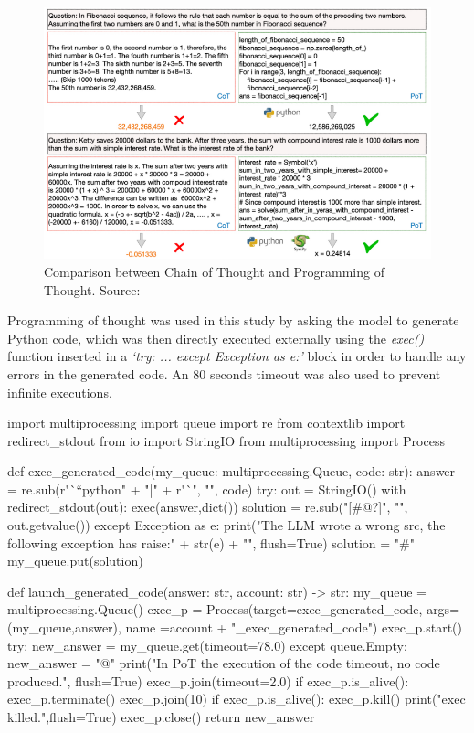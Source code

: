\documentclass[12pt]{article}
\begin{document}
    \begin{figure}[H]
    \centering
            \includegraphics[width=1\textwidth]{PoTTheory.png}
    \caption[Comparison between Chain of Thought and Programming of Thought]{Comparison between Chain of Thought and Programming of Thought. Source: \cite{chen2023programthoughtspromptingdisentangling}}
    \end{figure} 
    
    Programming of thought was used in this study by asking the model to generate Python code, which was then directly executed externally using the \textit{exec()} function inserted in a \textit{‘try: ... except Exception as e:’} block in order to handle any errors in the generated code. An 80 seconds timeout was also used to prevent infinite executions.
    
    \begin{python}
import multiprocessing
import queue
import re
from contextlib import redirect_stdout
from io import StringIO
from multiprocessing import Process



def exec_generated_code(my_queue: multiprocessing.Queue, code: str):
    answer = re.sub(r"```python" + "|" + r"`", "", code)
    try:
        out = StringIO()
        with redirect_stdout(out):
            exec(answer,dict())
        solution = re.sub("[#@?]", "", out.getvalue())
    except Exception as e:
        print("The LLM wrote a wrong src, the following exception has raise:\n" + str(e) + "\n", flush=True)
        solution = "#"
    my_queue.put(solution)


def launch_generated_code(answer: str, account: str) -> str:
    my_queue = multiprocessing.Queue()
    exec_p = Process(target=exec_generated_code, args=(my_queue,answer), name =account + "_exec_generated_code")
    exec_p.start()
    try:
        new_answer = my_queue.get(timeout=78.0)
    except queue.Empty:
        new_answer = "@"
        print("In PoT the execution of the code timeout, no code produced.", flush=True)
    exec_p.join(timeout=2.0)
    if exec_p.is_alive():
        exec_p.terminate()
        exec_p.join(10)
        if exec_p.is_alive():
            exec_p.kill()
        print("exec killed.",flush=True)
    exec_p.close()
    return new_answer
\end{python}
\end{document}
